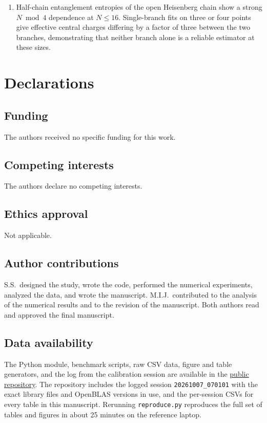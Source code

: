 \documentclass[pdflatex,sn-mathphys-num]{sn-jnl}
\begin{document}
\begin{enumerate}
  \item Half-chain entanglement entropies of the open Heisenberg
        chain show a strong $N \bmod 4$ dependence at $N \le 16$.
        Single-branch fits on three or four points give effective
        central charges differing by a factor of three between the
        two branches, demonstrating that neither branch alone is a
        reliable estimator at these sizes.
\end{enumerate}

\section*{Declarations}

\subsection*{Funding}
The authors received no specific funding for this work.

\subsection*{Competing interests}
The authors declare no competing interests.

\subsection*{Ethics approval}
Not applicable.

\subsection*{Author contributions}
S.S.\ designed the study, wrote the code, performed the numerical
experiments, analyzed the data, and wrote the manuscript. M.I.J.\
contributed to the analysis of the numerical results and to the
revision of the manuscript. Both authors read and approved the final
manuscript.

\subsection*{Data availability}
The Python module, benchmark scripts, raw CSV data, figure and table
generators, and the log from the calibration session are available
in the
\href{https://github.com/sswaid991-bit/ed-spin-chains}{public
repository}. The repository includes the logged session
\texttt{20261007\_070101} with the exact library files and OpenBLAS
versions in use, and the per-session CSVs for every table in this
manuscript. Rerunning \texttt{reproduce.py} reproduces the full set
of tables and figures in about 25 minutes on the reference laptop.
\end{document}
